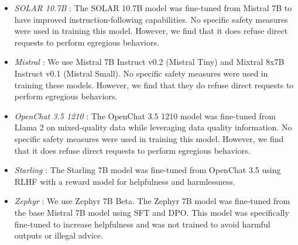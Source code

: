 \begin{itemize}
    \item \textit{SOLAR 10.7B} \citep{kim2023solar}: The SOLAR 10.7B model was fine-tuned from Mistral 7B to have improved instruction-following capabilities. No specific safety measures were used in training this model. However, we find that it does refuse direct requests to perform egregious behaviors.
    \item \textit{Mistral} \citep{jiang2023mistral}: We use Mistral 7B Instruct v0.2 (Mistral Tiny) and Mixtral 8x7B Instruct v0.1 (Mistral Small). No specific safety measures were used in training these models. However, we find that they do refuse direct requests to perform egregious behaviors.
    \item \textit{OpenChat 3.5 1210} \citep{wang2023openchat}: The OpenChat 3.5 1210 model was fine-tuned from Llama 2 on mixed-quality data while leveraging data quality information. No specific safety measures were used in training this model. However, we find that it does refuse direct requests to perform egregious behaviors.
    \item \textit{Starling} \citep{starling2023}: The Starling 7B model was fine-tuned from OpenChat 3.5 using RLHF with a reward model for helpfulness and harmlessness.
    \item \textit{Zephyr} \citep{tunstall2023zephyr}: We use Zephyr 7B Beta. The Zephyr 7B model was fine-tuned from the base Mistral 7B model using SFT and DPO. This model was specifically fine-tuned to increase helpfulness and was not trained to avoid harmful outputs or illegal advice.
\end{itemize}

